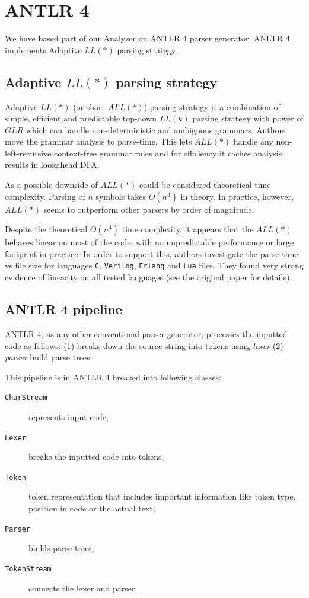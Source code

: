 

\section{ANTLR 4}
We have based part of our Analyzer on ANTLR 4 parser generator. ANLTR 4 implements Adaptive $LL(*)$ \cite{parr2014adaptive} parsing strategy.

\subsection{Adaptive $LL(*)$ parsing strategy}
Adaptive $LL(*)$ (or short $ALL(*)$) parsing strategy is a combination of simple, efficient and predictable top-down $LL(k)$ parsing strategy with power of $GLR$ which can handle non-deterministic and ambiguous grammars. 
Authors move the grammar analysis to parse-time. This lets $ALL(*)$ handle any non-left-recursive context-free grammar rules and for efficiency it caches analysis results in lookahead DFA.

As a possible downside of $ALL(*)$ could be considered theoretical time complexity. Parsing of $n$ symbols takes $O(n^4)$ in theory. In practice, however, $ALL(*)$ seems to outperform other parsers by order of magnitude.

Despite the theoretical $O(n^4)$ time complexity, it appears that the $ALL(*)$ behaves linear on most of the code, with no unpredictable performance or large footprint in practice. In order to support this, authors investigate the parse time vs file size for languages \texttt{C}, \texttt{Verilog}, \texttt{Erlang} and \texttt{Lua} files. They found very strong evidence of linearity on all tested languages (see the original paper for details).

\subsection{ANTLR 4 pipeline}

ANTLR 4, as any other conventional parser generator, processes the inputted code as follows: (1) breaks down the source string into tokens using \textit{lexer} (2) \textit{parser} build parse trees. 

This pipeline is in ANTLR 4 breaked into following classes: 

\begin{description}
	\item[\texttt{CharStream}] represents input code,
	\item[\texttt{Lexer}] breaks the inputted code into tokens,
	\item[\texttt{Token}] token representation that includes important information like token type, position in code or the actual text,
	\item[\texttt{Parser}] builds parse trees,
	\item[\texttt{TokenStream}] connects the lexer and parser.
\end{description}

